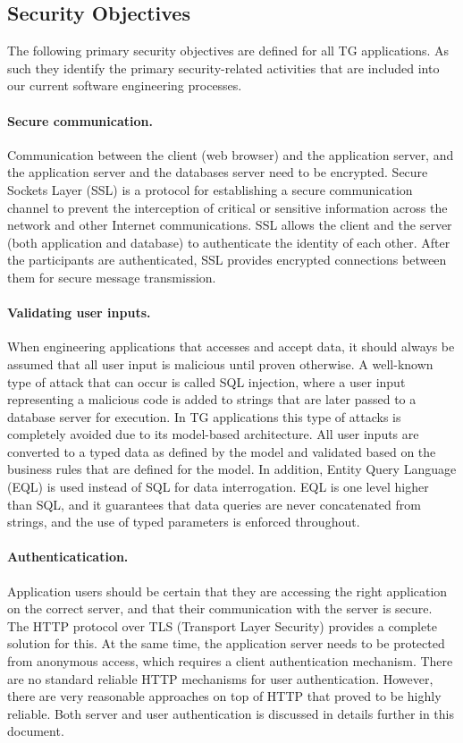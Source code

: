 \documentclass[a4paper,12pt,oneside,openright]{memoir}
\begin{document}
\subsection*{Security Objectives}

	The following primary security objectives are defined for all TG applications.
	As such they identify the primary security-related activities that are included into our current software engineering processes.

	\paragraph{Secure communication.} 
	    Communication between the client (web browser) and the application server, and the application server and the databases server need to be encrypted.
		Secure Sockets Layer (SSL) is a protocol for establishing a secure communication channel to prevent the interception of critical or sensitive information across the network and other Internet communications. 
		SSL allows the client and the server (both application and database) to authenticate the identity of each other. 
		After the participants are authenticated, SSL provides encrypted connections between them for secure message transmission.

	\paragraph{Validating user inputs.}
		When engineering applications that accesses and accept data, it should always be assumed that all user input is malicious until proven otherwise. 
		A well-known type of attack that can occur is called SQL injection, where a user input representing a malicious code is added to strings that are later passed to a database server for execution.
		In TG applications this type of attacks is completely avoided due to its model-based architecture.
		All user inputs are converted to a typed data as defined by the model and validated based on the business rules that are defined for the model.
		In addition, Entity Query Language (EQL) is used instead of SQL for data interrogation.
		EQL is one level higher than SQL, and it guarantees that data queries are never concatenated from strings, and the use of typed parameters is enforced throughout.

	\paragraph{Authenticatication.}
		Application users should be certain that they are accessing the right application on the correct server, and that their communication with the server is secure.
		The HTTP protocol over TLS (Transport Layer Security) provides a complete solution for this.
		At the same time, the application server needs to be protected from anonymous access, which requires a client authentication mechanism.
		There are no standard reliable HTTP mechanisms for user authentication. 
		However, there are very reasonable approaches on top of HTTP that proved to be highly reliable.
		Both server and user authentication is discussed in details further in this document.
\end{document}
